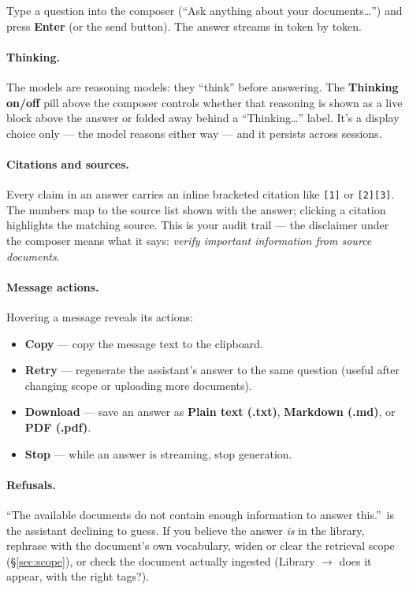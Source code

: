 \documentclass[11pt,letterpaper]{article}
\begin{document}
Type a question into the composer (``Ask anything about your
documents\ldots'') and press \textbf{Enter} (or the send button). The answer
streams in token by token.

\paragraph{Thinking.}
The models are reasoning models: they ``think'' before answering. The
\textbf{Thinking on/off} pill above the composer controls whether that
reasoning is shown as a live block above the answer or folded away behind a
``Thinking\ldots'' label. It's a display choice only --- the model reasons
either way --- and it persists across sessions.

\paragraph{Citations and sources.}
Every claim in an answer carries an inline bracketed citation like
\texttt{[1]} or \texttt{[2][3]}. The numbers map to the source list shown
with the answer; clicking a citation highlights the matching source. This is
your audit trail --- the disclaimer under the composer means what it says:
\emph{verify important information from source documents}.

\paragraph{Message actions.}
Hovering a message reveals its actions:

\begin{itemize}
  \item \textbf{Copy} --- copy the message text to the clipboard.
  \item \textbf{Retry} --- regenerate the assistant's answer to the same
        question (useful after changing scope or uploading more documents).
  \item \textbf{Download} --- save an answer as \textbf{Plain text (.txt)},
        \textbf{Markdown (.md)}, or \textbf{PDF (.pdf)}.
  \item \textbf{Stop} --- while an answer is streaming, stop generation.
\end{itemize}

\paragraph{Refusals.}
``The available documents do not contain enough information to answer
this.''\ is the assistant declining to guess. If you believe the answer
\emph{is} in the library, rephrase with the document's own vocabulary, widen
or clear the retrieval scope (\S\ref{sec:scope}), or check the document
actually ingested (Library $\rightarrow$ does it appear, with the right
tags?).
\end{document}
